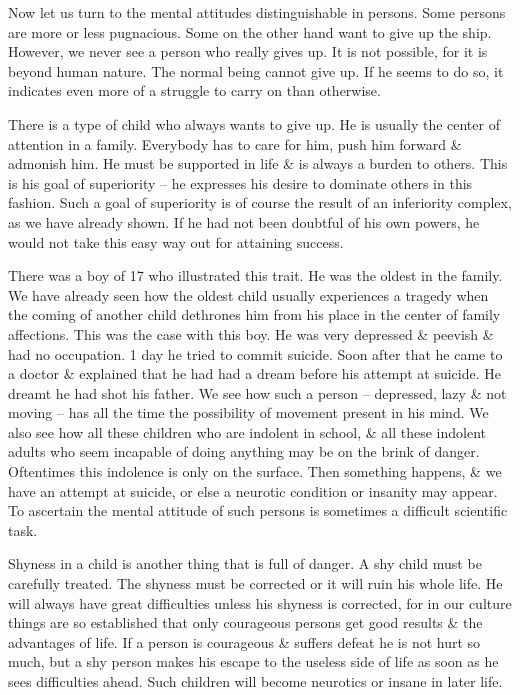 \documentclass{article}
\numberwithin{equation}{section}
\begin{document}
Now let us turn to the mental attitudes distinguishable in persons. Some persons are more or less pugnacious. Some on the other hand want to give up the ship. However, we never see a person who really gives up. It is not possible, for it is beyond human nature. The normal being cannot give up. If he seems to do so, it indicates even more of a struggle to carry on than otherwise.

There is a type of child who always wants to give up. He is usually the center of attention in a family. Everybody has to care for him, push him forward \& admonish him. He must be supported in life \& is always a burden to others. This is his goal of superiority -- he expresses his desire to dominate others in this fashion. Such a goal of superiority is of course the result of an inferiority complex, as we have already shown. If he had not been doubtful of his own powers, he would not take this easy way out for attaining success.

There was a boy of 17 who illustrated this trait. He was the oldest in the family. We have already seen how the oldest child usually experiences a tragedy when the coming of another child dethrones him from his place in the center of family affections. This was the case with this boy. He was very depressed \& peevish \& had no occupation. 1 day he tried to commit suicide. Soon after that he came to a doctor \& explained that he had had a dream before his attempt at suicide. He dreamt he had shot his father. We see how such a person -- depressed, lazy \& not moving -- has all the time the possibility of movement present in his mind. We also see how all these children who are indolent in school, \& all these indolent adults who seem incapable of doing anything may be on the brink of danger. Oftentimes this indolence is only on the surface. Then something happens, \& we have an attempt at suicide, or else a neurotic condition or insanity may appear. To ascertain the mental attitude of such persons is sometimes a difficult scientific task.

Shyness in a child is another thing that is full of danger. A shy child must be carefully treated. The shyness must be corrected or it will ruin his whole life. He will always have great difficulties unless his shyness is corrected, for in our culture things are so established that only courageous persons get good results \& the advantages of life. If a person is courageous \& suffers defeat he is not hurt so much, but a shy person makes his escape to the useless side of life as soon as he sees difficulties ahead. Such children will become neurotics or insane in later life.
\end{document}
